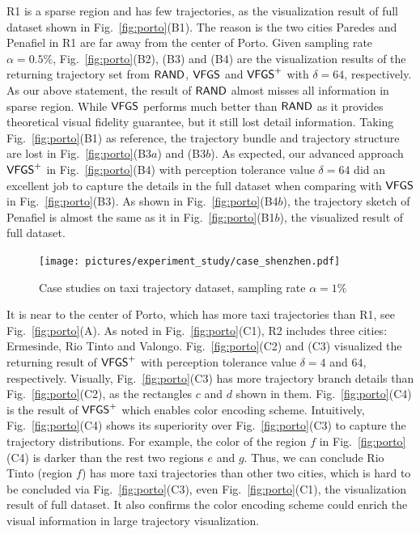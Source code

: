 R1 is a sparse region and has few trajectories, as the visualization result of full \pt{} dataset shown in Fig.~\ref{fig:porto}(B1).
The reason is the two cities Paredes and Penafiel in R1 are far away from the center of Porto.
Given sampling rate $\alpha=0.5\%$, Fig.~\ref{fig:porto}(B2), (B3) and (B4) are the visualization results of the returning trajectory set from $\mathsf{RAND}{}$, $\mathsf{VFGS}$ and $\mathsf{VFGS}^{+}$ with $\delta=64$, respectively.
As our above statement, the result of $\mathsf{RAND}$ almost misses all information in sparse region.
While $\mathsf{VFGS}$ performs much better than $\mathsf{RAND}$ as it provides theoretical visual fidelity guarantee, but it still lost detail information.
Taking Fig.~\ref{fig:porto}(B1) as reference, the trajectory bundle and trajectory structure are lost in Fig.~\ref{fig:porto}(B3$a$) and (B3$b$).
As expected, our advanced approach $\mathsf{VFGS}^{+}$ in Fig.~\ref{fig:porto}(B4) with perception tolerance value $\delta=64$ did an excellent job to capture the details in the full dataset when comparing with $\mathsf{VFGS}$ in Fig.~\ref{fig:porto}(B3).
As shown in Fig.~\ref{fig:porto}(B4$b$), the trajectory sketch of Penafiel is almost the same as it in Fig.~\ref{fig:porto}(B1$b$), the visualized result of full dataset.


\begin{figure}[t]
	\centering
	\texttt{[image: pictures/experiment\_study/case\_shenzhen.pdf]}
	\vspace{-4mm}
	\caption{Case studies on \sz{} taxi trajectory dataset, sampling rate $\alpha = 1\%$}
	\label{fig:shenzhen}
    \vspace{-3mm}
\end{figure}

 It is near to the center of Porto, which has more taxi trajectories than R1, see Fig.~\ref{fig:porto}(A).
As noted in Fig.~\ref{fig:porto}(C1), R2 includes three cities: Ermesinde, Rio Tinto and Valongo.
Fig.~\ref{fig:porto}(C2) and (C3) visualized the returning result of $\mathsf{VFGS}^{+}$ with perception tolerance value $\delta=4$ and $64$, respectively.
Visually, Fig.~\ref{fig:porto}(C3) has more trajectory branch details than Fig.~\ref{fig:porto}(C2), as the rectangles $c$ and $d$ shown in them.
Fig.~\ref{fig:porto}(C4) is the result of $\mathsf{VFGS}^{+}$ which enables color encoding scheme.
Intuitively, Fig.~\ref{fig:porto}(C4) shows its superiority over Fig.~\ref{fig:porto}(C3) to capture the trajectory distributions.
For example, the color of the region $f$ in Fig.~\ref{fig:porto}(C4) is {darker} than the rest two regions $e$ and $g$.
Thus, we can conclude Rio Tinto (region $f$) has more taxi trajectories than other two cities, which is hard to be concluded via Fig.~\ref{fig:porto}(C3), even Fig.~\ref{fig:porto}(C1), the visualization result of full dataset.
It also confirms the color encoding scheme could enrich the visual information in large trajectory visualization.

